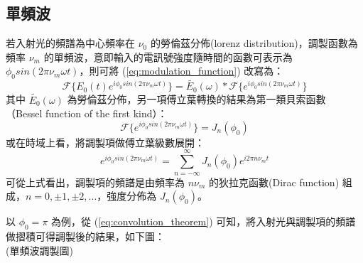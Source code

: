 \documentclass[class=NCU_thesis, crop=false]{standalone}
\begin{document}
\subsection{單頻波}
若入射光的頻譜為中心頻率在 $\nu_{0}$ 的勞倫茲分佈(lorenz distribution)，調製函數為頻率 $\nu_{m}$ 的單頻波，意即輸入的電訊號強度隨時間的函數可表示為 $\phi_{0} sin(2\pi \nu_{m} \omega t)$，則可將 (\ref{eq:modulation_function}) 改寫為：
\begin{equation}
\label{eq:convolution_theorem}
    \mathscr{F}\{E_{0}(t)e^{i\phi_{0} sin(2\pi \nu_{m} \omega t)}\}=\tilde{E_{0}}(\omega)*\mathscr{F}\{{e^{i\phi_{0} sin(2\pi \nu_{m} \omega t)}}\}
\end{equation}
其中 $\tilde{E_{0}}(\omega)$ 為勞倫茲分佈，另一項傅立葉轉換的結果為第一類貝索函數 （Bessel function of the first kind）：
\begin{equation}
    \mathscr{F}\{{e^{i\phi_{0} sin(2\pi \nu_{m} \omega t)}}\}=J_{n}(\phi_{0})
\end{equation}
或在時域上看，將調製項做傅立葉級數展開：
\begin{equation}
    e^{i\phi_{0} sin(2\pi \nu_{m} \omega t)}=\sum_{n=-\infty}^{\infty}J_{n}(\phi_{0})e^{i 2 \pi n \nu_{m} t}
\end{equation}
可從上式看出，調製項的頻譜是由頻率為 $n \nu_{m}$ 的狄拉克函數(Dirac function) 組成，$n=0, \pm1, \pm2, ...$，強度分佈為 $J_{n}(\phi_{0})$。

以 $\phi_{0}=\pi$ 為例，從 (\ref{eq:convolution_theorem}) 可知，將入射光與調製項的頻譜做摺積可得調製後的結果，如下圖：\\
(單頻波調製圖)\\
\end{document}
